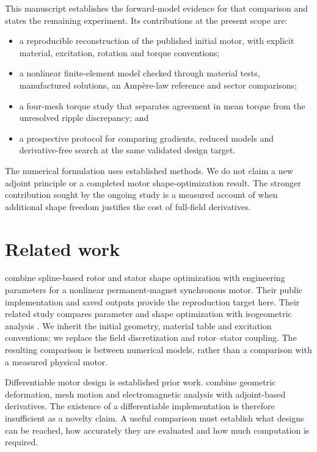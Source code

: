 \documentclass{anvil-paper}
\begin{document}
This manuscript establishes the forward-model evidence for that comparison
and states the remaining experiment. Its contributions at the present
scope are:
\begin{itemize}
  \item a reproducible reconstruction of the published initial motor, with
  explicit material, excitation, rotation and torque conventions;
  \item a nonlinear finite-element model checked through material tests,
  manufactured solutions, an Amp\`ere-law reference and sector comparisons;
  \item a four-mesh torque study that separates agreement in mean torque
  from the unresolved ripple discrepancy; and
  \item a prospective protocol for comparing gradients, reduced models
  and derivative-free search at the same validated design target.
\end{itemize}
The numerical formulation uses established methods. We do not claim a new
adjoint principle or a completed motor shape-optimization result. The
stronger contribution sought by the ongoing study is a measured account of
when additional shape freedom justifies the cost of full-field derivatives.

\section{Related work}
\citet{wiesheu2024spline} combine spline-based rotor and stator shape
optimization with engineering parameters for a nonlinear permanent-magnet
synchronous motor. Their public implementation and saved outputs provide
the reproduction target here. Their related study compares parameter and
shape optimization with isogeometric analysis
\citep{wiesheu2025combined}. We inherit the initial geometry, material
table and excitation conventions; we replace the field discretization and
rotor--stator coupling. The resulting comparison is between numerical
models, rather than a comparison with a measured physical motor.

Differentiable motor design is established prior work.
\citet{scotzniovsky2024} combine geometric deformation, mesh motion and
electromagnetic analysis with adjoint-based derivatives. The existence of
a differentiable implementation is therefore insufficient as a novelty
claim. A useful comparison must establish what designs can be reached,
how accurately they are evaluated and how much computation is required.
\end{document}
